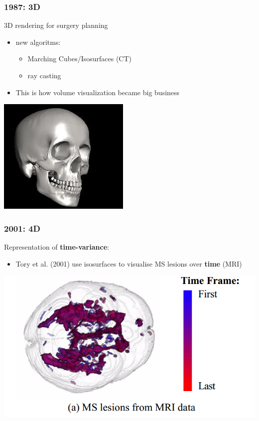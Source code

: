 \documentclass{beamer}
\begin{document}
\begin{frame}
	\frametitle{1987: 3D}
	3D rendering for surgery planning
	\begin{itemize}
		\item new algoritms:
		\begin{itemize}
			\item Marching Cubes/Isosurfaces (CT)
			\item ray casting
		\end{itemize}
		\item This is how volume visualization became big business
	\end{itemize}
	\begin{center}
		\includegraphics[width=.4\textwidth,height=.4\textheight]{images/marching}
	\end{center}
\end{frame}

\begin{frame}
	\frametitle{2001: 4D} %
	Representation of \textbf{time-variance}:
	\begin{itemize}
		\item Tory et al. (2001) use isosurfaces to visualise MS lesions over
			\textbf{time} (MRI)
	\end{itemize}
	\begin{center}
		\includegraphics[width=.8\textwidth]{images/ms_time}
	\end{center}
\end{frame}
\end{document}
